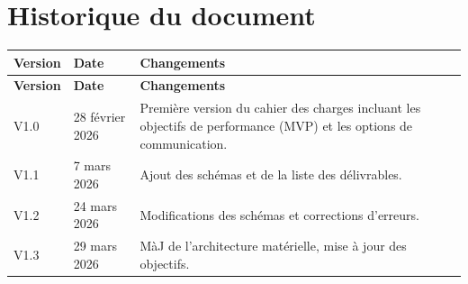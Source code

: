 \section*{Historique du document}
\begin{longtable}{|p{2cm}|p{3cm}|p{10cm}|}
\hline
\textbf{Version} & \textbf{Date} & \textbf{Changements} \\
\hline
\endfirsthead

\hline
\textbf{Version} & \textbf{Date} & \textbf{Changements} \\
\hline
\endhead

\hline
\endfoot

\hline
\endlastfoot
V1.0 & 28 février 2026 & Première version du cahier des charges incluant les objectifs de performance (MVP) et les options de communication.\\
\hline
V1.1 & 7 mars 2026 & Ajout des schémas et de la liste des délivrables.\\
\hline
V1.2 & 24 mars 2026 & Modifications des schémas et corrections d'erreurs.\\
\hline
V1.3 & 29 mars 2026 & MàJ de l'architecture matérielle, mise à jour des objectifs.\\\hline
\end{longtable}
